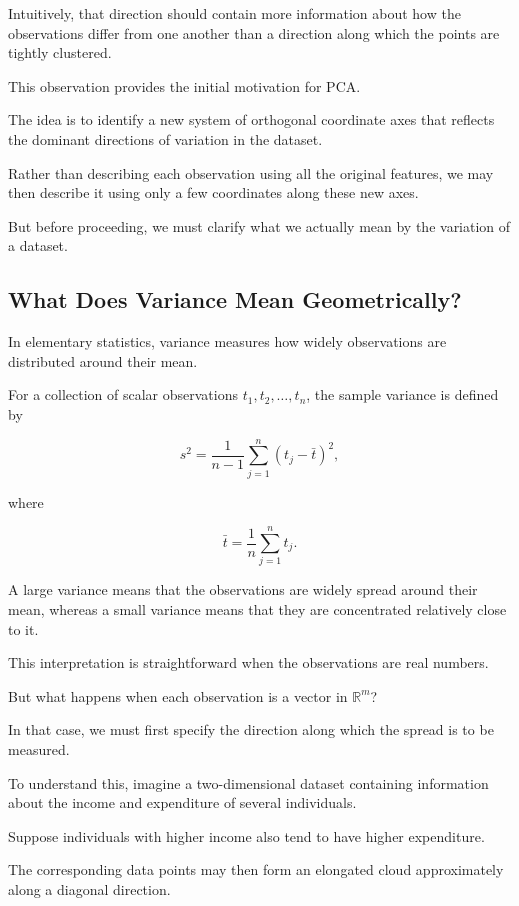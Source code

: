 \documentclass[11pt]{article}
\begin{document}
Intuitively, that direction should contain
more information about how the observations
differ from one another than a direction
along which the points are tightly clustered.

This observation provides the initial
motivation for PCA.

The idea is to identify a new system of
orthogonal coordinate axes that reflects
the dominant directions of variation
in the dataset.

Rather than describing each observation
using all the original features, we may
then describe it using only a few
coordinates along these new axes.

But before proceeding, we must clarify
what we actually mean by the variation
of a dataset.

\subsection{What Does Variance Mean Geometrically?}

In elementary statistics, variance measures
how widely observations are distributed
around their mean.

For a collection of scalar observations
$t_1,t_2,\ldots,t_n$, the sample variance
is defined by

\[
s^2=\frac{1}{n-1}
\sum_{j=1}^{n}(t_j-\bar{t})^2,
\]

where

\[
\bar{t}=\frac{1}{n}
\sum_{j=1}^{n}t_j.
\]

A large variance means that the observations
are widely spread around their mean,
whereas a small variance means that they
are concentrated relatively close to it.

This interpretation is straightforward
when the observations are real numbers.

But what happens when each observation
is a vector in $\mathbb{R}^m$?

In that case, we must first specify
the direction along which the spread
is to be measured.

To understand this, imagine a two-dimensional
dataset containing information about
the income and expenditure of several
individuals.

Suppose individuals with higher income
also tend to have higher expenditure.

The corresponding data points may then
form an elongated cloud approximately
along a diagonal direction.
\end{document}
